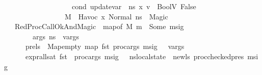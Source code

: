 \begin{isabellebody}
\ \ \ \ \ \ \ \ \ \ \ \ \ \ \ \ \ {\isasymLambda}{\isacharcomma}{\kern0pt}{\isasymGamma}{\isacharcomma}{\kern0pt}{\isasymOmega}\ {\isasymturnstile}\ {\isasymlangle}cond{\isacharcomma}{\kern0pt}\ {\isacharparenleft}{\kern0pt}update{\isacharunderscore}{\kern0pt}var\ {\isasymLambda}\ n{\isacharunderscore}{\kern0pt}s\ x\ v{\isacharparenright}{\kern0pt}{\isasymrangle}\ {\isasymDown}\ BoolV\ False\ {\isasymrbrakk}\ {\isasymLongrightarrow}\isanewline
\ \ \ \ \ \ \ \ \ \ \ \ \ \ \ \ \ M{\isacharcomma}{\kern0pt}{\isasymLambda}{\isacharcomma}{\kern0pt}{\isasymGamma}{\isacharcomma}{\kern0pt}{\isasymOmega}\ {\isasymturnstile}\ {\isasymlangle}Havoc\ x{\isacharcomma}{\kern0pt}\ Normal\ n{\isacharunderscore}{\kern0pt}s{\isasymrangle}\ {\isasymrightarrow}\ Magic{\isachardoublequoteclose}\isanewline
\isanewline
\ \ {\isacharbar}{\kern0pt}\ RedProcCallOkAndMagic{\isacharcolon}{\kern0pt}\ {\isachardoublequoteopen}{\isasymlbrakk}\ map{\isacharunderscore}{\kern0pt}of\ M\ m\ {\isacharequal}{\kern0pt}\ Some\ msig{\isacharsemicolon}{\kern0pt}\ \isanewline
\ \ \ \ \ \ {\isasymLambda}{\isacharcomma}{\kern0pt}{\isasymGamma}{\isacharcomma}{\kern0pt}{\isasymOmega}\ {\isasymturnstile}\ {\isasymlangle}args{\isacharcomma}{\kern0pt}\ n{\isacharunderscore}{\kern0pt}s{\isasymrangle}\ {\isacharbrackleft}{\kern0pt}{\isasymDown}{\isacharbrackright}{\kern0pt}\ v{\isacharunderscore}{\kern0pt}args{\isacharsemicolon}{\kern0pt}\isanewline
\ \ \ \ \ \ pre{\isacharunderscore}{\kern0pt}ls\ {\isacharequal}{\kern0pt}\ Map{\isachardot}{\kern0pt}empty{\isacharparenleft}{\kern0pt}\ {\isacharparenleft}{\kern0pt}map\ fst\ {\isacharparenleft}{\kern0pt}proc{\isacharunderscore}{\kern0pt}args\ msig\ {\isacharparenright}{\kern0pt}{\isacharparenright}{\kern0pt}\ {\isacharbrackleft}{\kern0pt}{\isasymmapsto}{\isacharbrackright}{\kern0pt}\ v{\isacharunderscore}{\kern0pt}args\ \ {\isacharparenright}{\kern0pt}\ {\isacharsemicolon}{\kern0pt}\isanewline
\ \ \ \ \ \ expr{\isacharunderscore}{\kern0pt}all{\isacharunderscore}{\kern0pt}sat\ {\isacharparenleft}{\kern0pt}fst\ {\isasymLambda}{\isacharcomma}{\kern0pt}\ proc{\isacharunderscore}{\kern0pt}args\ msig{\isacharparenright}{\kern0pt}\ {\isasymGamma}\ {\isasymOmega}\ {\isacharparenleft}{\kern0pt}n{\isacharunderscore}{\kern0pt}s{\isasymlparr}local{\isacharunderscore}{\kern0pt}state\ {\isacharcolon}{\kern0pt}{\isacharequal}{\kern0pt}\ new{\isacharunderscore}{\kern0pt}ls{\isasymrparr}{\isacharparenright}{\kern0pt}\ {\isacharparenleft}{\kern0pt}proc{\isacharunderscore}{\kern0pt}checked{\isacharunderscore}{\kern0pt}pres\ msig{\isacharparenright}{\kern0pt}{\isacharsemicolon}{\kern0pt}\isanewline

\end{isabellebody}
